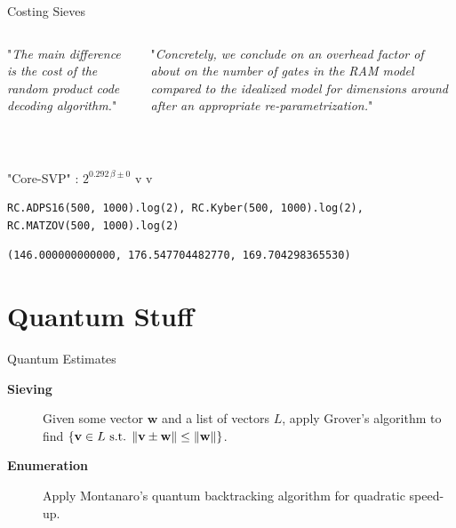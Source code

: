 \documentclass[table,10pt,aspectratio=169]{beamer}
\renewcommand{\vec}[1]{\ensuremath{\mathbf{#1}}\xspace}
\begin{document}
\begin{frame}[label={sec:org02f27bd},fragile]{Costing Sieves}
 \begin{columns}[t]
\begin{column}{0.5\columnwidth}
"\emph{The main difference is the cost of the random product code decoding algorithm.}"

\ \\
\scriptsize

\end{column}

\begin{column}{0.5\columnwidth}
"\emph{Concretely, we conclude on an overhead factor of about  on the number of gates in the RAM model compared to the idealized model for dimensions around  after an appropriate re-parametrization.}"

\ \\
\scriptsize

\end{column}
\end{columns}

"Core-SVP" \cite{USENIX:ADPS16}: \(2^{0.292\,\beta \pm 0}\) v \cite{NISTPQC-R3:CRYSTALS-KYBER20,AC:AGPS20} v \cite{Matzov22}

\lstset{language=Python,label= ,caption= ,captionpos=b,numbers=none}
\begin{lstlisting}
RC.ADPS16(500, 1000).log(2), RC.Kyber(500, 1000).log(2), RC.MATZOV(500, 1000).log(2)
\end{lstlisting}

\begin{verbatim}
(146.000000000000, 176.547704482770, 169.704298365530)
\end{verbatim}
\end{frame}

\section{Quantum Stuff}
\label{sec:org4f10863}
\begin{frame}[label={sec:org92f6e1c}]{Quantum Estimates}
\begin{description}
\item[{{\color{LightRed} \textbf{Sieving} }}] Given some vector \(\vec{w}\) and a list of vectors \(L\), apply Grover’s algorithm to find \(\{\vec{v} \in L \textnormal{ s.t. } \|\vec{v} \pm \vec{w}\| \leq \|\vec{w}\|\}\).

\item[{{\color{DarkBlue} \textbf{Enumeration} }}] Apply Montanaro’s quantum backtracking algorithm for quadratic speed-up.
\end{description}
\end{frame}
\end{document}
